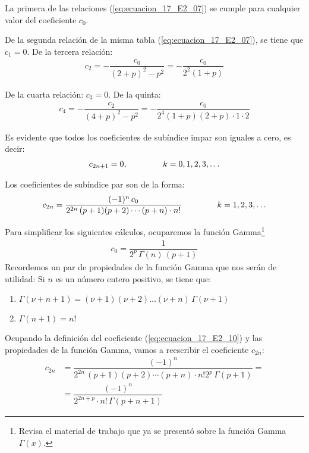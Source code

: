 La primera de las relaciones (\ref{eq:ecuacion_17_E2_07}) se cumple para cualquier valor del coeficiente $c_{0}$.
\par
De la segunda relación de la misma tabla (\ref{eq:ecuacion_17_E2_07}), se tiene que $c_{1} = 0$. De la tercera relación:
\begin{align*}
c_{2} = - \dfrac{c_{0}}{(2 + p)^{2} - p^{2}} = - \dfrac{c_{0}}{2^{2} (1 + p)}
\end{align*}

De la cuarta relación: $c_{3} = 0$. De la quinta:
\begin{align*}
c_{4} = - \dfrac{c_{2}}{(4 + p)^{2} - p^{2}} = - \dfrac{c_{0}}{2^{4} (1 + p)(2 + p) \cdot 1 \cdot 2}
\end{align*}

Es evidente que todos los coeficientes de subíndice impar son iguales a cero, es decir:
\begin{align}
c_{2n+1} = 0, \hspace{1.5cm} k = 0,1, 2, 3, \ldots
\label{eq:ecuacion_17_E2_08}
\end{align}

Los coeficientes de subíndice par son de la forma:
\begin{align}
c_{2n} = \dfrac{(-1)^{n} \, c_{0}}{2^{2n} \, (p + 1)(p + 2) \cdots (p + n) \cdot n!} \hspace{1.5cm} k = 1, 2, 3, \ldots
\label{eq:ecuacion_17_E2_09}
\end{align}

Para simplificar los siguientes cálculos, ocuparemos la función Gamma\footnote{Revisa el material de trabajo que ya se presentó sobre la función Gamma $\Gamma(x)$.}
\begin{align}
c_{0} = \dfrac{1}{2^{p} \, \Gamma(n) \, (p + 1)}
\label{eq:ecuacion_17_E2_10}
\end{align}
\newpage
Recordemos un par de propiedades de la función Gamma que nos serán de utilidad: Si $n$ es un número entero positivo, se tiene que:
\begin{enumerate}
\item $\Gamma (\nu + n + 1) = (\nu + 1)(\nu + 2) \ldots (\nu + n) \, \Gamma(\nu + 1)$
\item $\Gamma (n + 1) = n!$
\end{enumerate}

Ocupando la definición del coeficiente (\ref{eq:ecuacion_17_E2_10}) y las propiedades de la función Gamma, vamos a reescribir el coeficiente $c_{2n}$:
\begin{align*}
c_{2n} &= \dfrac{(-1)^{n}}{ 2^{2n} \, (p + 1)(p + 2) \cdots (p + n) \cdot n! 2^{p} \, \Gamma(p + 1)} = \\[1em]
&= \dfrac{(-1)^{n}}{ 2^{2n+p} \cdot n! \, \Gamma(p + n + 1)}
\end{align*}

